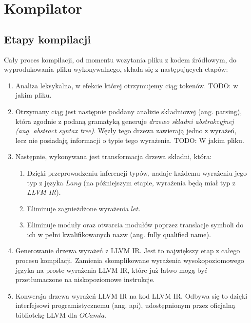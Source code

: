 \documentclass[declaration,shortabstract]{iithesis}
\begin{document}




\chapter{Kompilator}
\section{Etapy kompilacji}

Cały proces kompilacji, od momentu wczytania pliku z kodem źródłowym, do 
wyprodukowania pliku wykonywalnego, składa się z następujących etapów:
\begin{enumerate}
  \item Analiza leksykalna, w efekcie której otrzymujemy ciąg tokenów.
  TODO: w jakim pliku.
  \item Otrzymany ciąg jest następnie poddany analizie składniowej 
  (ang. parsing), która zgodnie z podaną gramatyką generuje \textit{drzewo 
  składni abstrakcyjnej (ang. abstract syntax tree)}. Węzły tego drzewa 
  zawierają jedno z wyrażeń, lecz nie posiadają informacji o typie tego
  wyrażenia. TODO: W jakim pliku.
  \item Następnie, wykonywana jest transformacja drzewa składni, która:

  \begin{enumerate}
    \item Dzięki przeprowadzeniu inferencji typów, nadaje każdemu wyrażeniu jego typ z języka $Lang$ (na późniejszym etapie, wyrażenia będą miał typ 
    z \textit{LLVM IR}). 
    \item Eliminuje zagnieżdżone wyrażenia $let$.
    \item Eliminuje moduły oraz otwarcia modułów poprzez translacje symboli do 
    ich w pełni kwalifikowanych nazw (ang. fully qualified name).
  \end{enumerate}

  \item Generowanie drzewa wyrażeń z LLVM IR. Jest to największy etap z całego 
  procesu kompilacji. Zamienia skomplikowane wyrażenia wysokopoziomowego języka
  na proste wyrażenia LLVM IR, które już łatwo mogą być przetłumaczone na 
  niskopoziomowe instrukcje.

  \item Konwersja drzewa wyrażeń LLVM IR na kod LLVM IR. Odbywa się to dzięki 
  interfejsowi programistycznemu (ang. api), udostępnionym przez oficjalną 
  bibliotekę LLVM dla $OCamla$.

\end{enumerate}
\end{document}
